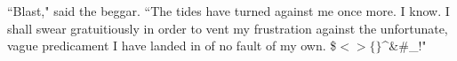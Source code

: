 ``Blast," said the beggar. ``The tides have turned against me once more. I know. I shall swear gratuitiously in order to vent my frustration against the unfortunate, vague predicament I have landed in of no fault of my own. \${}$<${}{}$>${}$\{$$\}$\^{}\&\#\_!"
